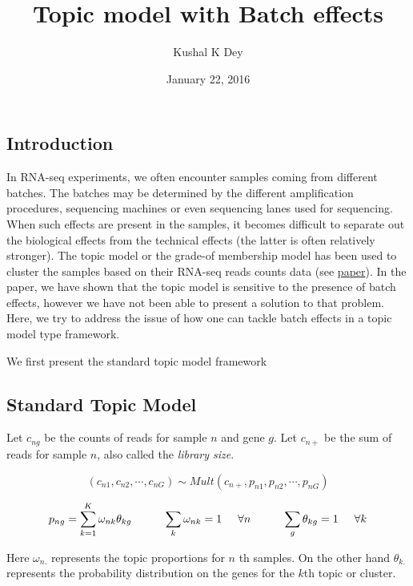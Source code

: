 \documentclass[]{article}
\title{Topic model with Batch effects}
\author{Kushal K Dey}
\date{January 22, 2016}
\begin{document}
\maketitle


\subsection{Introduction}\label{introduction}

In RNA-seq experiments, we often encounter samples coming from different
batches. The batches may be determined by the different amplification
procedures, sequencing machines or even sequencing lanes used for
sequencing. When such effects are present in the samples, it becomes
difficult to separate out the biological effects from the technical
effects (the latter is often relatively stronger). The topic model or
the grade-of membership model has been used to cluster the samples based
on their RNA-seq reads counts data (see
\href{https://github.com/stephenslab/count-clustering/blob/master/docs/main.pdf}{paper}).
In the paper, we have shown that the topic model is sensitive to the
presence of batch effects, however we have not been able to present a
solution to that problem. Here, we try to address the issue of how one
can tackle batch effects in a topic model type framework.

We first present the standard topic model framework

\subsection{Standard Topic Model}\label{standard-topic-model}

Let \(c_{ng}\) be the counts of reads for sample \(n\) and gene \(g\).
Let \(c_{n+}\) be the sum of reads for sample \(n\), also called the
\emph{library size}.

\[ (c_{n1}, c_{n2}, \cdots, c_{nG}) \sim Mult (c_{n+}, p_{n1}, p_{n2}, \cdots, p_{nG})  \]

\[ p_{ng} = \sum_{k=1}^{K} \omega_{nk} \theta_{kg} \hspace{1 cm} \sum_{k} \omega_{nk} =1 \hspace{0.5 cm} \forall n \hspace{1 cm} \sum_{g} \theta_{kg} =1 \hspace{0.5 cm} \forall k\]

Here \(\omega_{n.}\) represents the topic proportions for \(n\) th
samples. On the other hand \(\theta_{k.}\) represents the probability
distribution on the genes for the \(k\)th topic or cluster.
\end{document}
